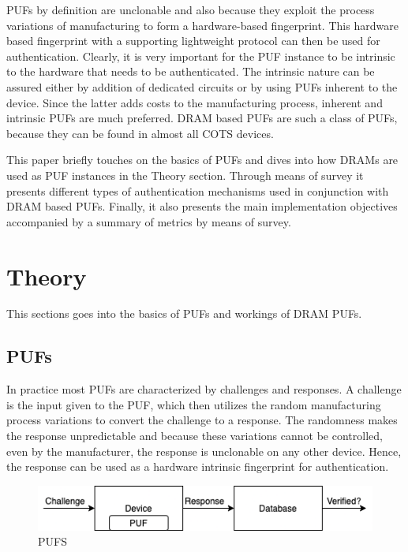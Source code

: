 \documentclass[journal, a4paper]{IEEEtran}
\begin{document}
PUFs by definition are unclonable and also because they exploit the process variations of manufacturing to form a hardware-based fingerprint. This hardware based fingerprint with a supporting lightweight protocol can then be used for authentication. Clearly, it is very important for the PUF instance to be intrinsic to the hardware that needs to be authenticated. The intrinsic nature can be assured either by addition of dedicated circuits or by using PUFs inherent to the device. Since the latter adds costs to the manufacturing process, inherent and intrinsic PUFs are much preferred. DRAM based PUFs are such a class of PUFs, because they can be found in almost all COTS devices.

This paper briefly touches on the basics of PUFs and dives into how DRAMs are used as PUF instances in the Theory section. Through means of survey it presents different types of authentication mechanisms used in conjunction with DRAM based PUFs. Finally, it also presents the main implementation objectives accompanied by a summary of metrics by means of survey.

\section{Theory}
This sections goes into the basics of PUFs and workings of DRAM PUFs.

\subsection{PUFs}
In practice most PUFs are characterized by challenges and responses. A challenge is the input given to the PUF, which then utilizes the random manufacturing process variations to convert the challenge to a response. The randomness makes the response unpredictable and because these variations cannot be controlled, even by the manufacturer, the response is unclonable on any other device. Hence, the response can be used as a hardware intrinsic fingerprint for authentication.

\begin{figure}[!hbt]
    \begin{center}
    \includegraphics[scale=0.5]{figs/PUF.png}
    \caption{PUFS}
    \label{fig:tf_plot}
    \end{center}
\end{figure}
\end{document}
